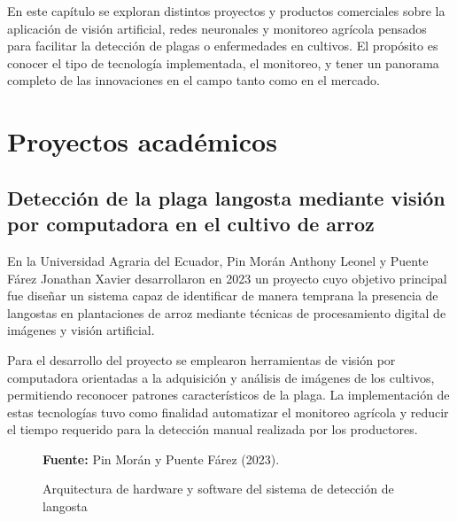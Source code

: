 
\clearpage
{}
\setcounter{page}{11}

En este capítulo se exploran distintos proyectos y productos comerciales sobre la aplicación de visión artificial, redes neuronales y monitoreo agrícola pensados para facilitar la detección de plagas o enfermedades en cultivos. El propósito es conocer el tipo de tecnología implementada, el monitoreo, y tener un panorama completo de las innovaciones en el campo tanto como en el mercado.



\section{Proyectos académicos}

\subsection{Detección de la plaga langosta mediante visión por computadora en el cultivo de arroz}

En la Universidad Agraria del Ecuador, Pin Morán Anthony Leonel y Puente Fárez Jonathan Xavier desarrollaron en 2023 un proyecto cuyo objetivo principal fue diseñar un sistema capaz de identificar de manera temprana la presencia de langostas en plantaciones de arroz mediante técnicas de procesamiento digital de imágenes y visión artificial.

Para el desarrollo del proyecto se emplearon herramientas de visión por computadora orientadas a la adquisición y análisis de imágenes de los cultivos, permitiendo reconocer patrones característicos de la plaga. La implementación de estas tecnologías tuvo como finalidad automatizar el monitoreo agrícola y reducir el tiempo requerido para la detección manual realizada por los productores.

\begin{figure}[H]
    \centering
    \caption{Arquitectura de hardware y software del sistema de detección de langosta}
    \label{fig:1_1_1}
    \vspace{0.2cm}
    \footnotesize \textbf{Fuente:} Pin Morán y Puente Fárez (2023).
\end{figure}

